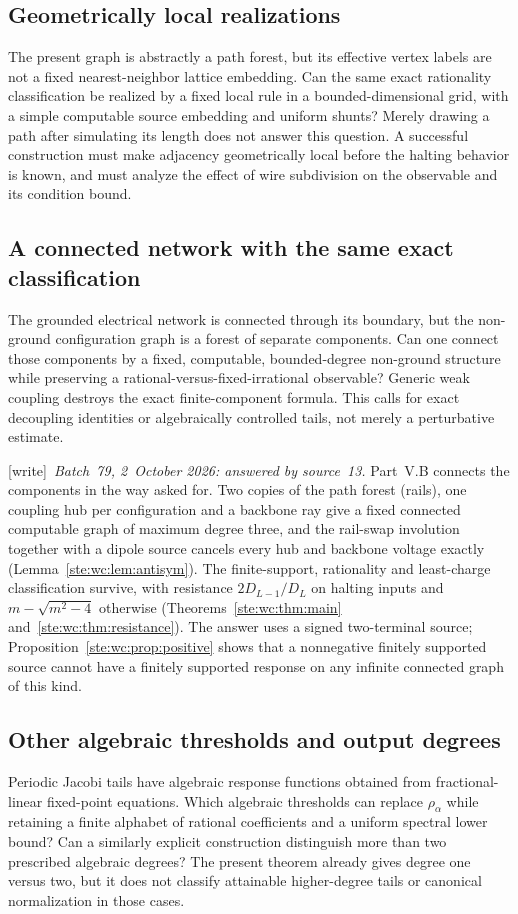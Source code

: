 \documentclass[11pt,letterpaper]{article}
\theoremstyle{definition}
\theoremstyle{remark}
\newcommand{\wtag}{\textup{[write]}}
\begin{document}
\subsection{Geometrically local realizations}\label{ste:cg:q:local}
The present graph is abstractly a path forest, but its effective vertex
labels are not a fixed nearest-neighbor lattice embedding. Can the same
exact rationality classification be realized by a fixed local rule in a
bounded-dimensional grid, with a simple computable source embedding and
uniform shunts? Merely drawing a path after simulating its length does
not answer this question. A successful construction must make adjacency
geometrically local before the halting behavior is known, and must analyze
the effect of wire subdivision on the observable and its condition bound.

\subsection{A connected network with the same exact classification}\label{ste:cg:q:connected}
The grounded electrical network is connected through its boundary, but
the non-ground configuration graph is a forest of separate components.
Can one connect those components by a fixed, computable, bounded-degree
non-ground structure while preserving a rational-versus-fixed-irrational
observable? Generic weak coupling destroys the exact finite-component
formula. This calls for exact decoupling identities or algebraically
controlled tails, not merely a perturbative estimate.

\wtag\ \emph{Batch~79, 2~October 2026: answered by source~13.} Part~V.B connects the components in the way asked for. Two copies of the path forest (rails), one coupling hub per configuration and a backbone ray give a fixed connected computable graph of maximum degree three, and the rail-swap involution together with a dipole source cancels every hub and backbone voltage exactly (Lemma~\ref{ste:wc:lem:antisym}). The finite-support, rationality and least-charge classification survive, with resistance $2D_{L-1}/D_L$ on halting inputs and $m-\sqrt{m^2-4}$ otherwise (Theorems~\ref{ste:wc:thm:main} and~\ref{ste:wc:thm:resistance}). The answer uses a signed two-terminal source; Proposition~\ref{ste:wc:prop:positive} shows that a nonnegative finitely supported source cannot have a finitely supported response on any infinite connected graph of this kind.

\subsection{Other algebraic thresholds and output degrees}\label{ste:cg:q:thresholds}
Periodic Jacobi tails have algebraic response functions obtained from
fractional-linear fixed-point equations. Which algebraic thresholds can
replace $\rho_\alpha$ while retaining a finite alphabet of rational
coefficients and a uniform spectral lower bound? Can a similarly explicit
construction distinguish more than two prescribed algebraic degrees?
The present theorem already gives degree one versus two, but it does not
classify attainable higher-degree tails or canonical normalization in
those cases.
\end{document}

